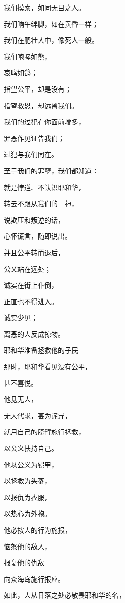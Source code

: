 {\par }{\Q 我们摸索，如同无目之人。
\par }{\Q 我们晌午绊脚，如在黄昏一样；
\par }{\Q 我们在肥壮人中，像死人一般。
\par }{\Q {}我们咆哮如熊，
\par }{\Q 哀鸣如鸽；
\par }{\Q 指望公平，却是没有；
\par }{\Q 指望救恩，却远离我们。
\par }{\Q {}我们的过犯在你面前增多，
\par }{\Q 罪恶作见证告我们；
\par }{\Q 过犯与我们同在。
\par }{\Q 至于我们的罪孽，我们都知道：
\par }{\Q {}就是悖逆、不认识耶和华，
\par }{\Q 转去不跟从我们的　神，
\par }{\Q 说欺压和叛逆的话，
\par }{\Q 心怀谎言，随即说出。
\par }{\Q {}并且公平转而退后，
\par }{\Q 公义站在远处；
\par }{\Q 诚实在街上仆倒，
\par }{\Q 正直也不得进入。
\par }{\Q {}诚实少见；
\par }{\Q 离恶的人反成掠物。
\par }{\SH 耶和华准备拯救他的子民
\par }{\Q 那时，耶和华看见没有公平，
\par }{\Q 甚不喜悦。
\par }{\Q {}他见无人{}，
\par }{\Q 无人代求，甚为诧异，
\par }{\Q 就用自己的膀臂施行拯救，
\par }{\Q 以公义扶持自己。
\par }{\Q {}他以公义为铠甲，
\par }{\Q 以拯救为头盔，
\par }{\Q 以报仇为衣服，
\par }{\Q 以热心为外袍。
\par }{\Q {}他必按人的行为施报，
\par }{\Q 恼怒他的敌人，
\par }{\Q 报复他的仇敌
\par }{\Q 向众海岛施行报应。
\par }{\PP {}如此，人从日落之处必敬畏耶和华的名，
}
